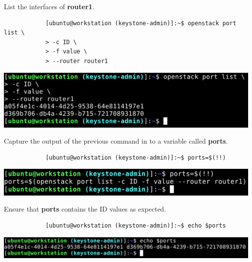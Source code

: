 \documentclass[letterpaper, 12pt]{article}
\begin{document}
\begin{enumerate}
    \begin{labstep}
        List the interfaces of \textbf{router1}.
        \begin{lstlisting}
            [ubuntu@workstation (keystone-admin)]:~$ openstack port list \
            > -c ID \
            > -f value \
            > --router router1
        \end{lstlisting}

        \begin{center}
            \includegraphics[width=\linewidth]{images/part5/step3.png}
        \end{center}
    \end{labstep}

    \begin{labstep}
        Capture the output of the previous command in to a variable called \textbf{ports}.
        \begin{lstlisting}
            [ubuntu@workstation (keystone-admin)]:~$ ports=$(!!)
        \end{lstlisting}

        \begin{center}
            \includegraphics[width=\linewidth]{images/part5/step4.png}
        \end{center}
    \end{labstep}

    \begin{labstep}
        Ensure that \textbf{ports} contains the ID values as expected.
        \begin{lstlisting}
            [ubuntu@workstation (keystone-admin)]:~$ echo $ports
        \end{lstlisting}

        \begin{center}
            \includegraphics[width=\linewidth]{images/part5/step5.png}
        \end{center}
    \end{labstep}


\end{enumerate}
\end{document}
